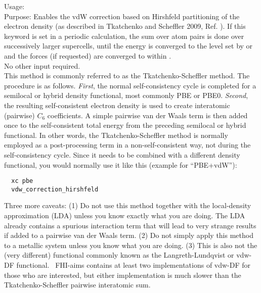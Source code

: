 {
  \noindent
  Usage:  \\[1.0ex]  
  Purpose: Enables the vdW correction based on Hirshfeld partitioning
  of the electron density (as described in Tkatchenko and Scheffler
  2009, Ref. \cite{TS-vdw}). If this keyword is set in a periodic
  calculation, the sum over atom pairs is done over successively
  larger supercells, until the energy is converged to the level set by
   or  
  and the forces (if requested) are 
  converged to within . \\ 
  No other
  input required. \\[1.0ex] 
}
This method is commonly referred to as the Tkatchenko-Scheffler
method. The procedure is as follows. \emph{First}, the normal
self-consistency cycle is completed for a semilocal or hybrid density
functional, most commonly PBE or PBE0. \emph{Second}, the resulting
self-consistent electron density is used to create interatomic
(pairwise) $C_6$  
coefficients. A simple pairwise van der Waals term is then added once
to the self-consistent total energy from the preceding semilocal or
hybrid functional. In other words, the Tkatchenko-Scheffler method is
normally employed as a post-processing term in a non-self-consistent
way, not during the self-consistency cycle. Since it needs to be
combined with a different density functional, you would normally use
it like this (example for ``PBE+vdW''):
\begin{verbatim}
  xc pbe
  vdw_correction_hirshfeld
\end{verbatim}
Three more caveats: (1) Do not use this method together with the
local-density approximation (LDA) unless you know exactly what you are
doing. The LDA already contains a spurious interaction term that will
lead to very strange results if added to a pairwise van der Waals
term. (2) Do not simply apply this method to a metallic system unless
you know what you are doing. (3) This is also not the (very different)
functional commonly known as the Langreth-Lundqvist or vdw-DF
functional.~\cite{Dion04} FHI-aims contains at least two
implementations of vdw-DF for those who are interested, but either
implementation is much slower than the Tkatchenko-Scheffler
pairwise interatomic sum. 

